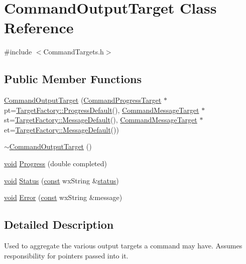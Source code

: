 \hypertarget{class_command_output_target}{}\section{Command\+Output\+Target Class Reference}
\label{class_command_output_target}


{\ttfamily \#include $<$Command\+Targets.\+h$>$}

\subsection*{Public Member Functions}
\begin{DoxyCompactItemize}
\item 
\hyperlink{class_command_output_target_aae25478ce0430eb3a3d245a5d9dd40af}{Command\+Output\+Target} (\hyperlink{class_command_progress_target}{Command\+Progress\+Target} $\ast$pt=\hyperlink{class_target_factory_a9e9b9854148982923ded8ce7dc3cac0e}{Target\+Factory\+::\+Progress\+Default}(), \hyperlink{class_command_message_target}{Command\+Message\+Target} $\ast$st=\hyperlink{class_target_factory_aa6f75ce7a6b1fee183b99d1b23d79eb5}{Target\+Factory\+::\+Message\+Default}(), \hyperlink{class_command_message_target}{Command\+Message\+Target} $\ast$et=\hyperlink{class_target_factory_aa6f75ce7a6b1fee183b99d1b23d79eb5}{Target\+Factory\+::\+Message\+Default}())
\item 
\hyperlink{class_command_output_target_a88e430e1d5bfabbf4e16dd85dfb2add2}{$\sim$\+Command\+Output\+Target} ()
\item 
\hyperlink{sound_8c_ae35f5844602719cf66324f4de2a658b3}{void} \hyperlink{class_command_output_target_a2abb375203ea50cfa495311989a7a564}{Progress} (double completed)
\item 
\hyperlink{sound_8c_ae35f5844602719cf66324f4de2a658b3}{void} \hyperlink{class_command_output_target_a5a9fc67a5be46ef7ee31abfee0136c05}{Status} (\hyperlink{getopt1_8c_a2c212835823e3c54a8ab6d95c652660e}{const} wx\+String \&\hyperlink{rfft2d_test_m_l_8m_a1b5437a866e6f95107b07ba845bc1800}{status})
\item 
\hyperlink{sound_8c_ae35f5844602719cf66324f4de2a658b3}{void} \hyperlink{class_command_output_target_ae4ebe2e694110570dd73d330cd3fc43d}{Error} (\hyperlink{getopt1_8c_a2c212835823e3c54a8ab6d95c652660e}{const} wx\+String \&message)
\end{DoxyCompactItemize}


\subsection{Detailed Description}
Used to aggregate the various output targets a command may have. Assumes responsibility for pointers passed into it. 

